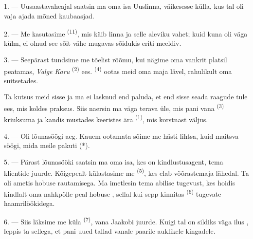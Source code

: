 
\VUsaut{4.0mm}
\VUsaut{3.0mm}
\VUfilet{16mm}
\VUsaut{5.6mm}
\VUsaut{3.0mm}

\VUsaut{3.0mm}

\VUsaut{4.0mm}

1. --- Uusaastavaheajal saatsin ma oma isa Uuslinna, väikesesse külla, kus tal oli
vaja ajada mõned kaubaasjad.

2. --- Me kasutasime  \textsuperscript{(11)}, mis käib linna ja selle
aleviku vahet; kuid kuna oli väga külm, ei olnud see sõit vähe mugavas sõidukis eriti
meeldiv.

3. --- Seepärast tundsime me tõelist rõõmu, kui nägime  oma vankrit
platsil peatamas, \textit{Valge Karu}  \textsuperscript{(2)} ees.
 \textsuperscript{(4)} ootas meid oma maja lävel,
rahulikult oma  suitsetades.

Ta kutsus meid sisse ja ma ei lasknud end paluda, et end sisse seada raagude tule ees,
mis koldes praksus. Siis naersin ma väga terava  üle, mis pani vana
 \textsuperscript{(3)} kriuksuma ja kandis mustades keeristes ära
 \textsuperscript{(1)}, mis korstnast väljus.

4. --- Oli lõunasöögi aeg. Kauem ootamata sõime me hästi lihtsa, kuid maitsva söögi,
mida meile pakuti (*).

\VUsaut{3.0mm}

5. --- Pärast lõunasööki saatsin ma oma isa, kes on kindlustusagent, tema klientide
juurde. Kõigepealt külastasime me  \textsuperscript{(5)}, kes elab
võõrastemaja lähedal. Ta oli ametis hobuse rautamisega. Ma imetlesin tema abilise
tugevust, kes hoidis kindlalt oma nahkpõlle peal hobuse , sellal kui
sepp kinnitas  \textsuperscript{(6)} tugevate haamrilöökidega.

6. --- Siis läksime me küla  \textsuperscript{(7)}, vana Jaakobi
juurde. Kuigi tal on sildiks väga ilus , leppis ta sellega, et pani uued
tallad vanale paarile auklikele kingadele.

